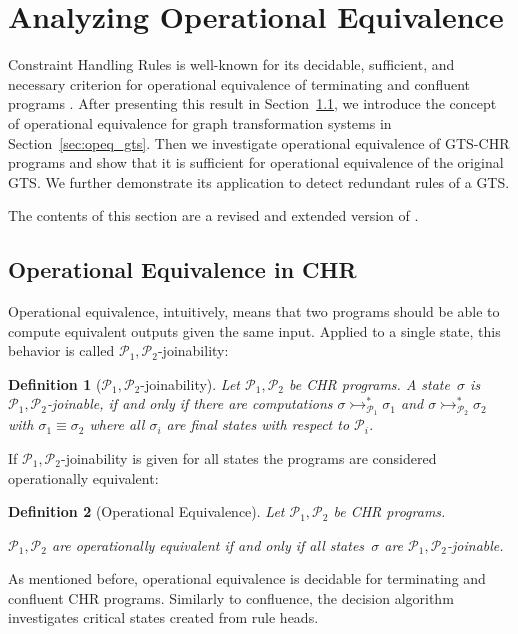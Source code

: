 \documentclass{tlp}
\newtheorem{definition}{Definition}[section]
\newcommand{\mcP}{\ensuremath{\mathcal{P}}}
\newcommand{\Ps}{\ensuremath{\mcP_1,\mcP_2}}
\newcommand{\der}{\ensuremath{\rightarrowtail}}
\begin{document}
\section{Analyzing Operational Equivalence}
\label{sec:opeq}

Constraint Handling Rules is well-known for its decidable, sufficient, and
necessary criterion for operational equivalence of terminating and confluent
programs \cite{abdennadherfruehwirth99,fruehwirth09}. After presenting this
result in Section~\ref{sec:opeq_chr}, we introduce the concept of operational
equivalence for graph transformation systems in Section~\ref{sec:opeq_gts}. Then
we investigate operational equivalence of GTS-CHR programs and show that it is
sufficient for operational equivalence of the original GTS. We further
demonstrate its application to detect redundant rules of a GTS.

The contents of this section are a revised and extended version of
\cite{Raiser2009b}.

\subsection{Operational Equivalence in CHR}
\label{sec:opeq_chr}

Operational equivalence, intuitively, means that two programs should be able to
compute equivalent outputs given the same input. Applied to a single state, this
behavior is called \Ps-joinability:

\begin{definition}[\Ps-joinability]\label{def:p_joinable} Let $\Ps$ be CHR
programs. A state~$\sigma$ is \emph{\Ps-joinable}, if and only if there are
computations $\sigma \der_{\mcP_1}^* \sigma_1$ and $\sigma \der_{\mcP_2}^*
\sigma_2$ with $\sigma_1 \equiv \sigma_2$ where all $\sigma_i$ are final states
with respect to $\mcP_i$.
\end{definition}

If \Ps-joinability is given for all states the programs are considered
operationally equivalent:

\begin{definition}[Operational Equivalence]
Let $\Ps$ be CHR programs.

$\Ps$ are \emph{operationally equivalent} if and only if all states~$\sigma$
are \Ps-joinable.
\end{definition}

As mentioned before, operational equivalence is decidable for terminating and
confluent CHR programs. Similarly to confluence, the decision algorithm
investigates critical states created from rule heads.
\end{document}
